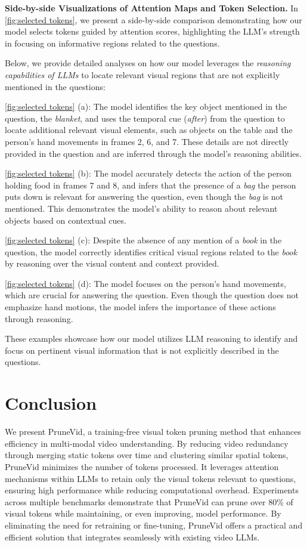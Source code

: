 \documentclass{article} %
\begin{document}
\textbf{Side-by-side Visualizations of Attention Maps and Token Selection.} In \cref{fig:selected tokens}, we present a side-by-side comparison demonstrating how our model selects tokens guided by attention scores, highlighting the LLM’s strength in focusing on informative regions related to the questions.

Below, we provide detailed analyses on how our model leverages the \textit{reasoning capabilities of LLMs} to locate relevant visual regions that are not explicitly mentioned in the questions:

\cref{fig:selected tokens} (a): The model identifies the key object mentioned in the question, the \textit{blanket}, and uses the temporal cue (\textit{after}) from the question to locate additional relevant visual elements, such as objects on the table and the person's hand movements in frames 2, 6, and 7. These details are not directly provided in the question and are inferred through the model's reasoning abilities.

\cref{fig:selected tokens} (b): The model accurately detects the action of the person holding food in frames 7 and 8, and infers that the presence of a \textit{bag} the person puts down is relevant for answering the question, even though the \textit{bag} is not mentioned. This demonstrates the model's ability to reason about relevant objects based on contextual cues.

\cref{fig:selected tokens} (c): Despite the absence of any mention of a \textit{book} in the question, the model correctly identifies critical visual regions related to the \textit{book} by reasoning over the visual content and context provided.

\cref{fig:selected tokens} (d): The model focuses on the person's hand movements, which are crucial for answering the question. Even though the question does not emphasize hand motions, the model infers the importance of these actions through reasoning.

These examples showcase how our model utilizes LLM reasoning to identify and focus on pertinent visual information that is not explicitly described in the questions.


\section{Conclusion}
We present PruneVid, a training-free visual token pruning method that enhances efficiency in multi-modal video understanding. By reducing video redundancy through merging static tokens over time and clustering similar spatial tokens, PruneVid minimizes the number of tokens processed. It leverages attention mechanisms within LLMs to retain only the visual tokens relevant to questions, ensuring high performance while reducing computational overhead. Experiments across multiple benchmarks demonstrate that PruneVid can prune over 80\% of visual tokens while maintaining, or even improving, model performance. By eliminating the need for retraining or fine-tuning, PruneVid offers a practical and efficient solution that integrates seamlessly with existing video LLMs.
\end{document}
